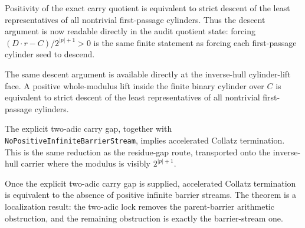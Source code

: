 \begin{theorem}
  \label{thm:collatz-two-adic-carry-quotient-descent}
  \leanok
  Positivity of the exact carry quotient is equivalent to strict descent of the
  least representatives of all nontrivial first-passage cylinders. Thus the
  descent argument is now readable directly in the audit quotient state:
  forcing \((D\cdot r-C)/2^{|p|+1}>0\) is the same finite statement as forcing
  each first-passage cylinder seed to descend.
\end{theorem}
\begin{theorem}
  \label{thm:collatz-two-adic-cylinder-lift-descent}
  \leanok
  The same descent argument is available directly at the inverse-hull
  cylinder-lift face. A positive whole-modulus lift inside the finite binary
  cylinder over \(C\) is equivalent to strict descent of the least representatives
  of all nontrivial first-passage cylinders.
\end{theorem}
\begin{theorem}
  \label{thm:collatz-two-adic-no-infinite-stream}
  \leanok
  The explicit two-adic carry gap, together with
  \texttt{NoPositiveInfiniteBarrierStream}, implies accelerated Collatz termination.
  This is the same reduction as the residue-gap route, transported onto the
  inverse-hull carrier where the modulus is visibly \(2^{|p|+1}\).
\end{theorem}
\begin{theorem}
  \label{thm:collatz-two-adic-exact-obstruction}
  \leanok
  Once the explicit two-adic carry gap is supplied, accelerated Collatz termination
  is equivalent to the absence of positive infinite barrier streams. The theorem is
  a localization result: the two-adic lock removes the parent-barrier arithmetic
  obstruction, and the remaining obstruction is exactly the barrier-stream one.
\end{theorem}

